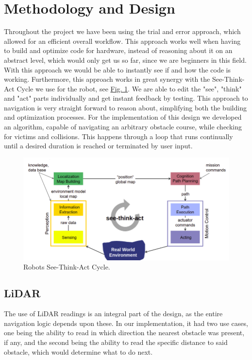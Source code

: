 \documentclass[conference]{IEEEtran}
\begin{document}
\section{Methodology and Design}
Throughout the project we have been using the trial and error approach, which allowed for an efficient overall workflow. 
This approach works well when having to build and optimize code for hardware, instead of reasoning about it on an abstract level, which would only get us so far, since we are beginners in this field.
With this approach we would be able to instantly see if and how the code is working.
Furthermore, this approach works in great synergy with the See-Think-Act Cycle we use for the robot, see \href{sec:STAC}{Fig. 1}.
We are able to edit the "see", "think" and "act" parts individually and get instant feedback by testing. 
This approach to navigation is very straight forward to reason about, simplifying both the building and optimization processes.
For the implementation of this design we developed an algorithm, capable of navigating an arbitrary obstacle course, while checking for victims and collisions.
This happens through a loop that runs continually until a desired duration is reached or terminated by user input. 
\begin{figure}[htbp]
    \centerline{\includegraphics[width=1.0\columnwidth]{Pictures/STAC.png}}
    \caption{Robots See-Think-Act Cycle.}
    \label{sec:STAC}
    \end{figure}

\subsection{LiDAR}
The use of LiDAR readings is an integral part of the design, as the entire navigation logic depends upon these.
In our implementation, it had two use cases, one being the ability to read in which direction the nearest obstacle was present, if any, and the second being the ability to read the specific distance to said obstacle, which would determine what to do next.
\end{document}
